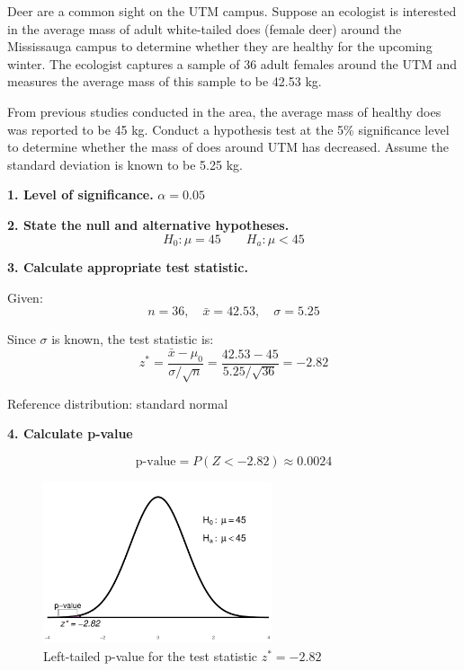 \begin{example}
Deer are a common sight on the UTM campus. Suppose an ecologist is interested in the average mass of adult white-tailed does (female deer) around the Mississauga campus to determine whether they are healthy for the upcoming winter. The ecologist captures a sample of 36 adult females around the UTM and measures the average mass of this sample to be 42.53 kg.

From previous studies conducted in the area, the average mass of healthy does was reported to be 45 kg. Conduct a hypothesis test at the 5\% significance level to determine whether the mass of does around UTM has decreased. Assume the standard deviation is known to be 5.25 kg.


\vspace{1em}

\textbf{1. Level of significance.} \(\alpha = 0.05\)

\textbf{2. State the null and alternative hypotheses.}
\[
H_0: \mu = 45 \qquad H_a: \mu < 45
\]

\textbf{3. Calculate appropriate test statistic.}

\vspace{0.5em}

Given:
\[
n = 36, \quad \bar{x} = 42.53, \quad \sigma = 5.25
\]

Since \(\sigma\) is known, the test statistic is:
\[
z^* = \frac{\bar{x} - \mu_0}{\sigma / \sqrt{n}} = \frac{42.53 - 45}{5.25/\sqrt{36}} = -2.82
\]

Reference distribution: standard normal

\textbf{4. Calculate p-value}

\[
\text{p-value} = P(Z < -2.82) \approx 0.0024
\]


\begin{figure}[H]
\centering
\includegraphics[width=0.6\textwidth]{section11/images/deer_pvalue.pdf}
\vspace{-0.25em} %
\captionsetup{skip=0pt}
\caption{Left-tailed p-value for the test statistic \( z^* = -2.82 \)}
\end{figure}


\end{example}
